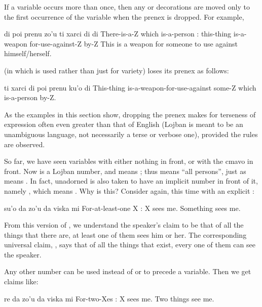 If a variable occurs more than once, then any  or
     decorations are moved only to the first occurrence of
    the variable when the prenex is dropped. For example,
\begin{example}
di poi prenu zo'u\n
\T	ti xarci di di\n
There-is-a-Z which is-a-person :\n
\T	this-thing is-a-weapon for-use-against-Z by-Z\n
This is a weapon for someone to use against\n
\T	himself/herself.
\end{example}

(in which  is used rather than  just for variety)
    loses its prenex as follows:
\begin{example}
ti xarci di\n
\T	poi prenu ku'o di\n
This-thing is-a-weapon-for-use-against\n
\T	some-Z which is-a-person by-Z.
\end{example}

As the examples in this section show, dropping the prenex makes
    for terseness of expression often even greater than that of
    English (Lojban is meant to be an unambiguous language, not
    necessarily a terse or verbose one), provided the rules are
    observed.



So far, we have seen variables with either nothing in front,
    or with the cmavo  in front. Now  is a Lojban
    number, and means ; thus  means ``all
    persons'', just as  means . In fact,
    unadorned  is also taken to have an implicit number in
    front of it, namely , which means . Why
    is this? Consider  again, this
    time with an explicit :
\begin{example}
su'o da zo'u da viska mi\n
For-at-least-one X : X sees me.\n
Something sees me.
\end{example}

From this version of , we
    understand the speaker's claim to be that of all the things
    that there are, at least one of them sees him or her. The
    corresponding universal claim, ,
    says that of all the things that exist, every one of them can
    see the speaker.

Any other number can be used instead of  or 
    to precede a variable. Then we get claims like:
\begin{example}
re da zo'u da viska mi\n
For-two-Xes : X sees me.\n
Two things see me.
\end{example}

